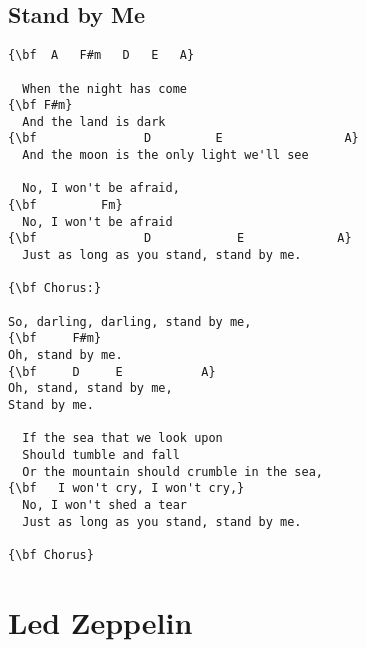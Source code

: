 \documentclass[a4paper]{article}
\begin{document}
\subsection{Stand by Me} %
\label{sub:Stand by Me}
\begin{Verbatim}[commandchars=\\\{\}]
{\bf  A   F#m   D   E   A}

  When the night has come
{\bf F#m}
  And the land is dark
{\bf               D         E                 A}
  And the moon is the only light we'll see

  No, I won't be afraid,
{\bf         Fm}
  No, I won't be afraid
{\bf               D            E             A}
  Just as long as you stand, stand by me.

{\bf Chorus:}

So, darling, darling, stand by me,
{\bf     F#m}
Oh, stand by me.
{\bf     D     E           A}
Oh, stand, stand by me,
Stand by me.

  If the sea that we look upon
  Should tumble and fall
  Or the mountain should crumble in the sea,
{\bf   I won't cry, I won't cry,}
  No, I won't shed a tear
  Just as long as you stand, stand by me.

{\bf Chorus}
\end{Verbatim}
\newpage
\section{Led Zeppelin} %
\label{sec:Led Zeppeli}
\end{document}
